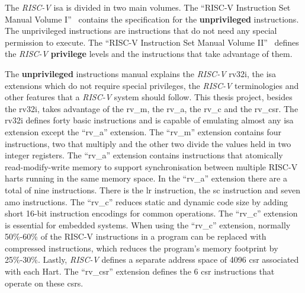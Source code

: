 The \textit{RISC-V} \acrshort{isa} is divided in two main volumes. The \enquote{RISC-V Instruction Set Manual Volume I}~\cite{riscv_unprivilege} contains the specification for the \textbf{unprivileged} instructions. The unprivileged instructions are instructions that do not need any special permission to execute. The \enquote{RISC-V Instruction Set Manual Volume II}~\cite{riscv_privilege} defines the \textit{RISC-V} \textbf{privilege} levels and the instructions that take advantage of them.

The \textbf{unprivileged} instructions manual explains the \textit{RISC-V} \acrfull{rv32i}, the \acrshort{isa} extensions which do not require special privileges, the \textit{RISC-V} terminologies and other features that a \textit{RISC-V} system should follow. This thesis project, besides the \acrshort{rv32i}, takes advantage of the \acrfull{rv_m}, the \acrfull{rv_a}, the \acrfull{rv_c} and the \acrfull{rv_csr}. The \acrshort{rv32i} defines forty basic instructions and is capable of emulating almost any \acrshort{isa} extension except the \enquote{\acrshort{rv_a}} extension. The \enquote{\acrshort{rv_m}} extension contains four instructions, two that multiply and the other two divide the values held in two integer registers. The \enquote{\acrshort{rv_a}} extension contains instructions that atomically read-modify-write memory to support synchronisation between multiple RISC-V harts running in the same memory space. In the \enquote{\acrshort{rv_a}} extension there are a total of nine instructions. There is the \acrfull{lr} instruction, the \acrfull{sc} instruction and seven \acrfull{amo} instructions. The \enquote{\acrshort{rv_c}} reduces static and dynamic code size by adding short 16-bit instruction encodings for common operations. The \enquote{\acrshort{rv_c}} extension is essential for embedded systems. When using the \enquote{\acrshort{rv_c}} extension, normally 50\%-60\% of the RISC-V instructions in a program can be replaced with compressed instructions, which reduces the program's memory footprint by 25\%-30\%. Lastly, \textit{RISC-V} defines a separate address space of 4096 \acrfull{csr} associated with each Hart. The \enquote{\acrshort{rv_csr}} extension defines the 6 \acrshort{csr} instructions that operate on these \acrshort{csr}s.

